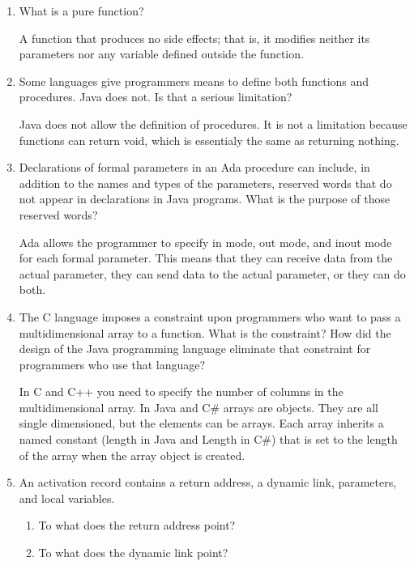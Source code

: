\begin{enumerate}
  \item What is a pure function?

  \begin{answer}
    A function that produces no side effects; that is, it modifies neither its parameters nor any variable defined outside the function.
  \end{answer}

  \item Some languages give programmers means to define
    both functions and procedures. Java does not. Is that
    a serious limitation?

  \begin{answer}
    Java does not allow the definition of procedures.  It is not a limitation because functions can return void, which is essentialy the same as returning nothing.
  \end{answer}

  \item Declarations of formal parameters in an Ada procedure
    can include, in addition to the names and types of the
    parameters, reserved words that do not appear in declarations
    in Java programs. 
    What is the purpose of those reserved words?

    \begin{answer}
    Ada allows the programmer to specify in mode, out mode, and inout mode for each formal parameter.  This means that they can receive data from the actual parameter, they can send data to the actual parameter, or they can do both.
    \end{answer}
 
  \item The C language imposes a constraint upon programmers
    who want to pass a multidimensional array to a function.
    What is the constraint? How did the design of the Java
    programming language eliminate that constraint for 
    programmers who use that language?

  \begin{answer}
    In C and C++ you need to specify the number of columns in the multidimensional array.  In Java and C\# arrays are objects.  They are all single dimensioned, but the elements can be arrays. Each array inherits a named constant (length in Java and Length in C\#) that is set to the length of
the array when the array object is created. 
  \end{answer}


  \item An activation record contains a return
    address, a dynamic link, parameters, and
    local variables.
  \begin{enumerate}
    \item To what does the return address point?
    \item To what does the dynamic link point?
    \end{enumerate}


\end{enumerate}
